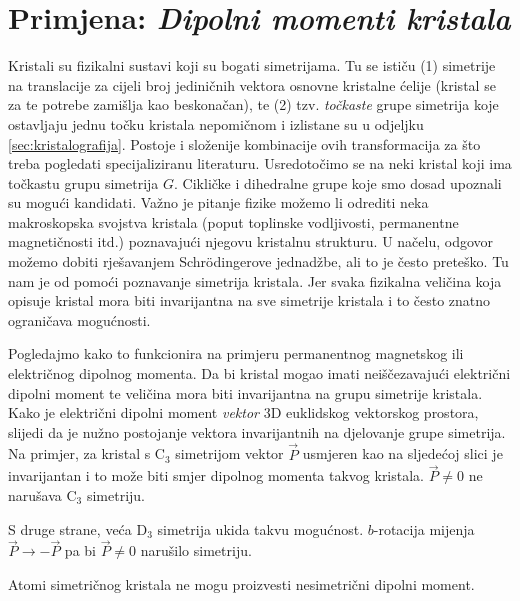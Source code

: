 \section{Primjena: \emph{Dipolni momenti kristala}}
\label{sec:dipolni}

Kristali su fizikalni sustavi koji su bogati simetrijama. Tu se
ističu (1) simetrije na translacije za cijeli broj jediničnih vektora
osnovne kristalne ćelije (kristal se za te potrebe zamišlja kao beskonačan),
te (2) tzv. \emph{točkaste} grupe simetrija koje ostavljaju jednu točku
kristala nepomičnom i izlistane su u odjeljku \ref{sec:kristalografija}.
Postoje i složenije kombinacije ovih transformacija za što treba pogledati
specijaliziranu literaturu. Usredotočimo se na neki kristal koji
ima točkastu grupu simetrija $G$. Cikličke i dihedralne grupe koje smo
dosad upoznali su mogući kandidati. Važno je pitanje fizike možemo li odrediti
neka makroskopska svojstva kristala (poput toplinske vodljivosti,
permanentne magnetičnosti itd.) poznavajući njegovu kristalnu strukturu.
U načelu, odgovor možemo dobiti rješavanjem Schr\"{o}dingerove jednadžbe,
ali to je često preteško. Tu nam je od pomoći poznavanje simetrija
kristala. Jer svaka fizikalna veličina koja opisuje kristal mora
biti invarijantna na sve simetrije kristala i to često znatno
ograničava mogućnosti.

Pogledajmo kako to funkcionira na primjeru
permanentnog magnetskog ili električnog dipolnog
momenta. Da bi kristal mogao imati neiščezavajući
električni dipolni moment
te veličina mora biti invarijantna na grupu simetrije
kristala.
Kako je električni dipolni moment \emph{vektor} 3D euklidskog vektorskog prostora,
slijedi da je nužno postojanje vektora invarijantnih na djelovanje grupe simetrija.
Na primjer, za kristal s C$_3$ simetrijom vektor $\vec{P}$ usmjeren
kao na sljedećoj slici je invarijantan i
to može biti smjer dipolnog momenta takvog kristala. $\vec{P}\neq 0$
ne narušava C$_3$ simetriju.

\centerline{}

S druge strane, veća D$_3$ simetrija ukida takvu mogućnost. $b$-rotacija
mijenja $\vec{P}\to-\vec{P}$ pa bi $\vec{P}\neq 0$ narušilo simetriju.

\centerline{}

Atomi simetričnog kristala ne mogu proizvesti nesimetrični dipolni moment.

